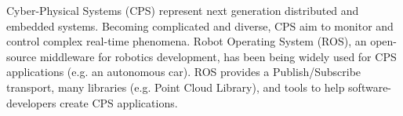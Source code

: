 \documentclass{sig-alternate-ipsn13}
\begin{document}
{%
}

\maketitle



Cyber-Physical Systems (CPS) represent next generation distributed and embedded systems. Becoming complicated and diverse, CPS aim to monitor and control complex real-time phenomena. Robot Operating System (ROS), an open-source middleware for robotics development, has been being widely used for CPS applications (e.g. an autonomous car). ROS provides a Publish/Subscribe transport, many libraries (e.g. Point Cloud Library), and tools to help software-developers create CPS applications.
\end{document}
